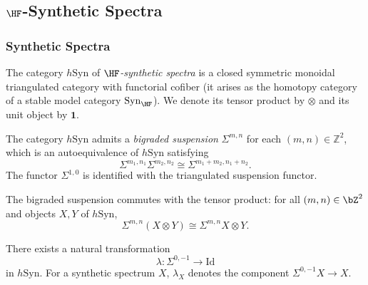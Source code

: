 \subsection{$\HF$-Synthetic Spectra}\label{sec:prereq-synthetic}

\subsubsection{Synthetic Spectra}\label{sec:prereq-syn-basic}

\begin{definition}\label{prereq:def:synthetic-category}
    \leanok
    The category $h\mathrm{Syn}$ of \emph{$\HF$-synthetic spectra} is a closed symmetric monoidal triangulated category with functorial cofiber (it arises as the homotopy category of a stable model category $\mathrm{Syn}_{\HF}$). We denote its tensor product by $\otimes$ and its unit object by $\mathbf{1}$.
\end{definition}

\begin{definition}\label{prereq:def:bigraded-suspension}
    \leanok
    The category $h\mathrm{Syn}$ admits a \emph{bigraded suspension} $\Sigma^{m,n}$ for each $(m,n) \in \mathbb{Z}^2$, which is an autoequivalence of $h\mathrm{Syn}$ satisfying
    $$\Sigma^{m_1,n_1}\Sigma^{m_2,n_2} \cong \Sigma^{m_1+m_2, n_1+n_2}.$$
    The functor $\Sigma^{1,0}$ is identified with the triangulated suspension functor.
\end{definition}

\begin{axiom}\label{prereq:ax:bishift-tensor-comm}
    The bigraded suspension commutes with the tensor product: for all $(m,n) \in \bZ^2$ and objects $X, Y$ of $h\mathrm{Syn}$,
    $$\Sigma^{m,n}(X \otimes Y) \cong \Sigma^{m,n}X \otimes Y.$$
\end{axiom}

\begin{definition}\label{prereq:def:lambda}
    \leanok
    There exists a natural transformation
    $$\lambda: \Sigma^{0,-1} \to \mathrm{Id}$$
    in $h\mathrm{Syn}$. For a synthetic spectrum $X$, $\lambda_X$ denotes the component $\Sigma^{0,-1}X \to X$.
\end{definition}

